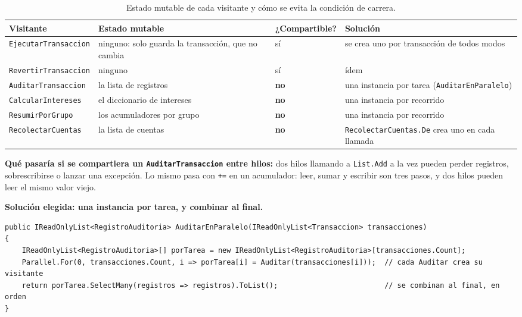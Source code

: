 \begin{table}[H]
\centering
\small
\begin{tabularx}{\textwidth}{>{\raggedright\arraybackslash}p{3.6cm}
                             >{\raggedright\arraybackslash}X
                             >{\raggedright\arraybackslash}p{2.8cm}
                             >{\raggedright\arraybackslash}X}
\toprule
\textbf{Visitante} & \textbf{Estado mutable} & \textbf{¿Compartible?} & \textbf{Solución} \\
\midrule
\texttt{EjecutarTransaccion} & ninguno: solo guarda la transacción, que no cambia & sí & se
  crea uno por transacción de todos modos \\
\texttt{RevertirTransaccion} & ninguno & sí & ídem \\
\texttt{AuditarTransaccion} & la lista de registros & \textbf{no} & una instancia por tarea
  (\texttt{AuditarEnParalelo}) \\
\texttt{CalcularIntereses} & el diccionario de intereses & \textbf{no} & una instancia por
  recorrido \\
\texttt{ResumirPorGrupo} & los acumuladores por grupo & \textbf{no} & una instancia por
  recorrido \\
\texttt{RecolectarCuentas} & la lista de cuentas & \textbf{no} & \texttt{RecolectarCuentas.De}
  crea uno en cada llamada \\
\bottomrule
\end{tabularx}
\caption{Estado mutable de cada visitante y cómo se evita la condición de carrera.}
\end{table}

\textbf{Qué pasaría si se compartiera un \texttt{AuditarTransaccion} entre hilos:} dos hilos
llamando a \texttt{List.Add} a la vez pueden perder registros, sobrescribirse o lanzar una
excepción. Lo mismo pasa con \texttt{+=} en un acumulador: leer, sumar y escribir son tres
pasos, y dos hilos pueden leer el mismo valor viejo.

\textbf{Solución elegida: una instancia por tarea, y combinar al final.}

\begin{lstlisting}[basicstyle=\ttfamily\footnotesize, columns=fullflexible, keepspaces=true]
public IReadOnlyList<RegistroAuditoria> AuditarEnParalelo(IReadOnlyList<Transaccion> transacciones)
{
    IReadOnlyList<RegistroAuditoria>[] porTarea = new IReadOnlyList<RegistroAuditoria>[transacciones.Count];
    Parallel.For(0, transacciones.Count, i => porTarea[i] = Auditar(transacciones[i]));  // cada Auditar crea su visitante
    return porTarea.SelectMany(registros => registros).ToList();                         // se combinan al final, en orden
}
\end{lstlisting}


